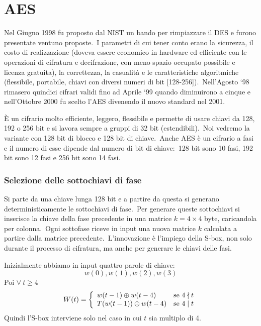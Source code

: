 \section{AES}

Nel Giugno 1998 fu proposto dal NIST un bando per rimpiazzare il DES e furono presentate ventuno proposte.\
I parametri di cui tener conto erano la sicurezza, il costo di realizzazione (doveva essere economico in hardware ed efficiente con le operazioni di cifratura e decifrazione, con meno spazio occupato possibile e licenza gratuita), la correttezza, la casualità e le caratteristiche algoritmiche (flessibile, portabile, chiavi con diversi numeri di bit [128-256]).\
Nell'Agosto `98 rimasero quindici cifrari validi fino ad Aprile `99 quando diminuirono a cinque e nell'Ottobre 2000 fu scelto l'AES divenendo il nuovo standard nel 2001.

È un cifrario molto efficiente, leggero, flessibile e permette di usare chiavi da 128, 192 o 256 bit e si lavora sempre a gruppi di 32 bit (estendibili).\
Noi vedremo la variante con 128 bit di blocco e 128 bit di chiave.\
Anche AES è un cifrario a fasi e il numero di esse dipende dal numero di bit di chiave:\ 128 bit sono 10 fasi, 192 bit sono 12 fasi e 256 bit sono 14 fasi.

\subsubsection{Selezione delle sottochiavi di fase}

Si parte da una chiave lunga 128 bit e a partire da questa si generano deterministicamente le sottochiavi di fase.\
Per generare queste sottochiavi si inserisce la chiave della fase precedente in una matrice $k = 4 \times 4$ byte, caricandola per colonna.\
Ogni sottofase riceve in input una nuova matrice $k$ calcolata a partire dalla matrice precedente.\
L'innovazione è l'impiego della S-box, non solo durante il processo di cifratura, ma anche per generare le chiavi delle fasi.\

Inizialmente abbiamo in input quattro parole di chiave:\ \[w(0), w(1), w(2), w(3)\]
Poi $\forall\ t\geq 4$
\[W(t) = \left\{\begin{array}{l l}
        w(t-1) \oplus w(t-4)    & \mathrm{se}\ 4 \nmid t \\
        T(w(t-1)) \oplus w(t-4) & \mathrm{se}\ 4 \mid t  \\
    \end{array}\right.\]
Quindi l'S-box interviene solo nel caso in cui $t$ sia multiplo di 4.\

